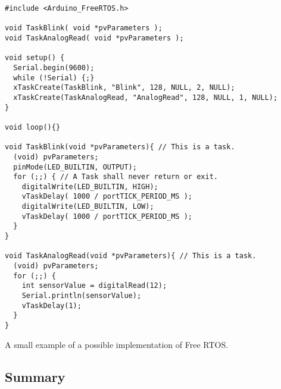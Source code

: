 \begin{listing}[htb!]
\centering
\begin{verbatim}
#include <Arduino_FreeRTOS.h>

void TaskBlink( void *pvParameters );
void TaskAnalogRead( void *pvParameters );

void setup() {
  Serial.begin(9600);
  while (!Serial) {;}
  xTaskCreate(TaskBlink, "Blink", 128, NULL, 2, NULL);
  xTaskCreate(TaskAnalogRead, "AnalogRead", 128, NULL, 1, NULL);
}

void loop(){}

void TaskBlink(void *pvParameters){ // This is a task.
  (void) pvParameters;
  pinMode(LED_BUILTIN, OUTPUT);
  for (;;) { // A Task shall never return or exit.
    digitalWrite(LED_BUILTIN, HIGH);
    vTaskDelay( 1000 / portTICK_PERIOD_MS );
    digitalWrite(LED_BUILTIN, LOW);
    vTaskDelay( 1000 / portTICK_PERIOD_MS );
  }
}

void TaskAnalogRead(void *pvParameters){ // This is a task.
  (void) pvParameters;
  for (;;) {
    int sensorValue = digitalRead(12);
    Serial.println(sensorValue);
    vTaskDelay(1);
  }
}
\end{verbatim}
\caption{A small example of a possible implementation of Free RTOS.}
\label{List:freeftosexample}
\end{listing}








\subsection{Summary}

